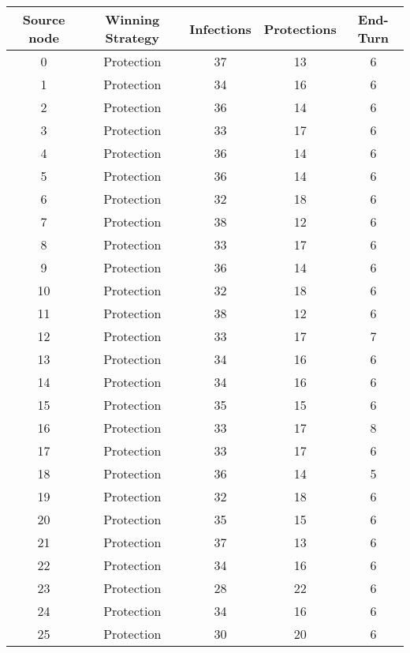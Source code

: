 \documentclass[results.tex]{subfiles}
\begin{document}
\begin{center}
  \begin{tabular}{| c || c | c | c | c |}
    \hline
    {\bfseries Source node} & {\bfseries Winning Strategy} & {\bfseries Infections} & {\bfseries Protections} & {\bfseries End-Turn} \\  %
    \hline\hline
    0 & Protection & 37 & 13 & 6 \\ 
    \hline
    1 & Protection & 34 & 16 & 6 \\ 
    \hline
    2 & Protection & 36 & 14 & 6 \\ 
    \hline
    3 & Protection & 33 & 17 & 6 \\ 
    \hline
    4 & Protection & 36 & 14 & 6 \\ 
    \hline
    5 & Protection & 36 & 14 & 6 \\ 
    \hline
    6 & Protection & 32 & 18 & 6 \\ 
    \hline
    7 & Protection & 38 & 12 & 6 \\ 
    \hline
    8 & Protection & 33 & 17 & 6 \\ 
    \hline
    9 & Protection & 36 & 14 & 6 \\ 
    \hline
    10 & Protection & 32 & 18 & 6 \\ 
    \hline
    11 & Protection & 38 & 12 & 6 \\ 
    \hline
    12 & Protection & 33 & 17 & 7 \\ 
    \hline
    13 & Protection & 34 & 16 & 6 \\ 
    \hline
    14 & Protection & 34 & 16 & 6 \\ 
    \hline
    15 & Protection & 35 & 15 & 6 \\ 
    \hline
    16 & Protection & 33 & 17 & 8 \\ 
    \hline
    17 & Protection & 33 & 17 & 6 \\ 
    \hline
    18 & Protection & 36 & 14 & 5 \\ 
    \hline
    19 & Protection & 32 & 18 & 6 \\ 
    \hline
    20 & Protection & 35 & 15 & 6 \\ 
    \hline
    21 & Protection & 37 & 13 & 6 \\ 
    \hline
    22 & Protection & 34 & 16 & 6 \\ 
    \hline
    23 & Protection & 28 & 22 & 6 \\ 
    \hline
    24 & Protection & 34 & 16 & 6 \\ 
    \hline
    25 & Protection & 30 & 20 & 6 \\ 

\end{tabular}
\end{center}
\end{document}
